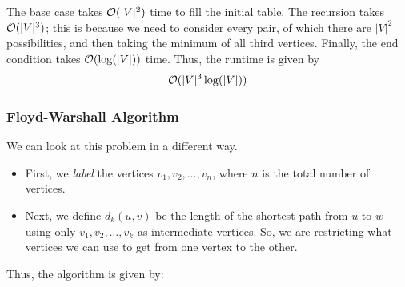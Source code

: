 \documentclass[letterpaper]{article}
\begin{document}
The base case takes $\mathcal{O}(|V|^2)$ time to fill the initial table. The recursion takes $\mathcal{O}(|V|^3)$; this is because we need to consider every pair, of which there are $|V|^2$ possibilities, and then taking the minimum of all third vertices. Finally, the end condition takes $\mathcal{O}(\log(|V|))$ time. Thus, the runtime is given by 
\[\mathcal{O}(|V|^3 \log(|V|))\]


\subsubsection{Floyd-Warshall Algorithm}
We can look at this problem in a different way. 
\begin{itemize}
    \item First, we \emph{label} the vertices $v_1, v_2, \dots, v_n$, where $n$ is the total number of vertices. 
    \item Next, we define $d_{k}(u, v)$ be the length of the shortest path from $u$ to $w$ using only $v_1, v_2, \dots, v_k$ as intermediate vertices. So, we are restricting what vertices we can use to get from one vertex to the other. 
\end{itemize}
Thus, the algorithm is given by: 
\end{document}
